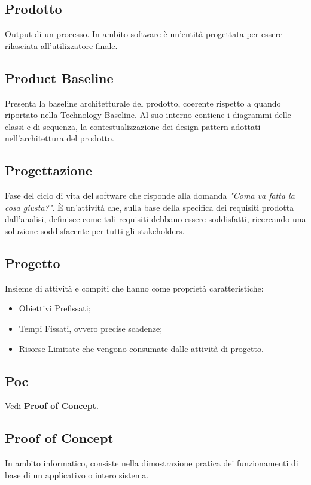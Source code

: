 \subsection{Prodotto}
Output di un processo. In ambito software è un'entità progettata per essere rilasciata all'utilizzatore finale.

\subsection{Product Baseline}
Presenta la baseline architetturale del prodotto, coerente rispetto a quando riportato nella Technology Baseline. Al suo interno contiene i diagrammi delle classi e di sequenza, la contestualizzazione dei design pattern adottati nell'architettura del prodotto.

\subsection{Progettazione}
Fase del ciclo di vita del software che risponde alla domanda \textit{"Coma va fatta la cosa giusta?"}. È un'attività che, sulla base della specifica dei requisiti prodotta dall'analisi, definisce come tali requisiti debbano essere soddisfatti, ricercando una soluzione soddisfacente per tutti gli stakeholders.

\subsection{Progetto}
Insieme di attività e compiti che hanno come proprietà caratteristiche:
\begin{itemize}
	\item Obiettivi Prefissati;
	\item Tempi Fissati, ovvero precise scadenze;
	\item Risorse Limitate che vengono consumate dalle attività di progetto.
\end{itemize}

\subsection{Poc}
Vedi \textbf{Proof of Concept}.

\subsection{Proof of Concept}
In ambito informatico, consiste nella dimostrazione pratica dei funzionamenti di base di un applicativo o intero sistema.

